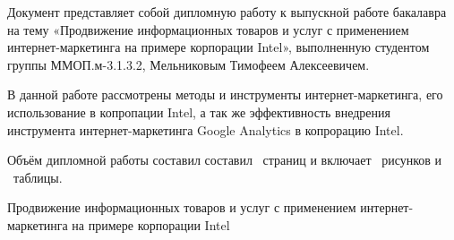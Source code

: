 \documentclass[a4paper,english,russian]{G2-105}
\begin{document}
\par Документ представляет собой дипломную работу к выпускной работе бакалавра на тему «Продвижение информационных товаров и услуг с применением интернет-маркетинга на примере корпорации Intel», выполненную студентом группы ММОП.м-3.1.3.2, Мельниковым Тимофеем Алексеевичем.
\par В данной работе рассмотрены методы и инструменты интернет-маркетинга, его использование в копропации Intel, а так же эффективность внедрения инструмента интернет-маркетинга Google Analytics в копрорацию Intel.
\par Объём дипломной работы составил составил \totalpages~страниц и включает \totalfigures~рисунков и \totaltables~таблицы. 

\newpage
\par Продвижение информационных товаров и услуг с применением интернет-маркетинга на примере корпорации Intel
\tableofcontents
\newpage
\end{document}
